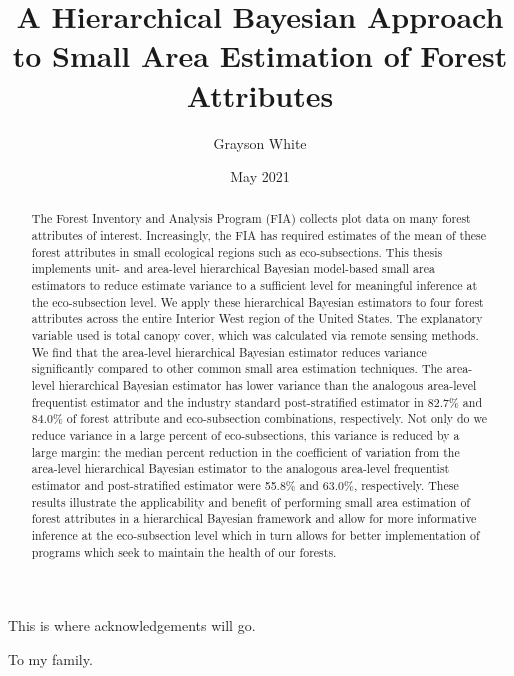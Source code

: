\documentclass[12pt,twoside]{reedthesis}
\title{A Hierarchical Bayesian Approach to Small Area Estimation of Forest Attributes}
\author{Grayson White}
\date{May 2021}
\begin{document}
  \maketitle

\frontmatter %
\pagestyle{empty} %
  \begin{acknowledgements}
    This is where acknowledgements will go.
  \end{acknowledgements}

  \hypersetup{linkcolor=black}
  \setcounter{secnumdepth}{2}
  \setcounter{tocdepth}{2}
  \tableofcontents

  \listoftables

  \listoffigures
  \begin{abstract}
    The Forest Inventory and Analysis Program (FIA) collects plot data on many forest attributes of interest. Increasingly, the FIA has required estimates of the mean of these forest attributes in small ecological regions such as eco-subsections. This thesis implements unit- and area-level hierarchical Bayesian model-based small area estimators to reduce estimate variance to a sufficient level for meaningful inference at the eco-subsection level. We apply these hierarchical Bayesian estimators to four forest attributes across the entire Interior West region of the United States. The explanatory variable used is total canopy cover, which was calculated via remote sensing methods. We find that the area-level hierarchical Bayesian estimator reduces variance significantly compared to other common small area estimation techniques. The area-level hierarchical Bayesian estimator has lower variance than the analogous area-level frequentist estimator and the industry standard post-stratified estimator in 82.7\% and 84.0\% of forest attribute and eco-subsection combinations, respectively. Not only do we reduce variance in a large percent of eco-subsections, this variance is reduced by a large margin: the median percent reduction in the coefficient of variation from the area-level hierarchical Bayesian estimator to the analogous area-level frequentist estimator and post-stratified estimator were 55.8\% and 63.0\%, respectively. These results illustrate the applicability and benefit of performing small area estimation of forest attributes in a hierarchical Bayesian framework and allow for more informative inference at the eco-subsection level which in turn allows for better implementation of programs which seek to maintain the health of our forests.
  \end{abstract}
  \begin{dedication}
    To my family.
  \end{dedication}
\mainmatter %
\pagestyle{fancyplain} %
\end{document}
